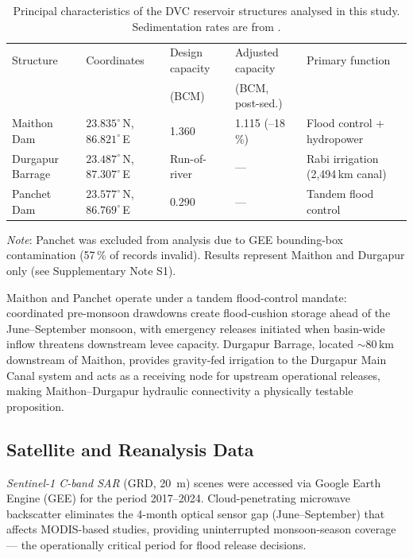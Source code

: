 \documentclass[preprint,12pt,authoryear]{elsarticle}
\begin{document}
\begin{table}[htbp]
  \centering
  \caption{Principal characteristics of the DVC reservoir structures analysed
           in this study. Sedimentation rates are from
           \citet{CWC2022}.}
  \label{tab:reservoirs}
  \begin{tabularx}{\linewidth}{lXXXX}
    \toprule
    Structure & Coordinates & Design capacity & Adjusted capacity & Primary function \\
              &             & (BCM)          & (BCM, post-sed.) &                  \\
    \midrule
    Maithon Dam    & $23.835^\circ$\,N, $86.821^\circ$\,E & 1.360 & 1.115 (--18\,\%) & Flood control + hydropower \\
    Durgapur Barrage & $23.487^\circ$\,N, $87.307^\circ$\,E & Run-of-river & --- & Rabi irrigation (2,494\,km canal) \\
    Panchet Dam    & $23.577^\circ$\,N, $86.769^\circ$\,E & 0.290 & --- & Tandem flood control \\
    \bottomrule
  \end{tabularx}
  \smallskip

  {\footnotesize\textit{Note}: Panchet was excluded from analysis due to
  GEE bounding-box contamination (57\,\% of records invalid). Results
  represent Maithon and Durgapur only (see Supplementary Note S1).}
\end{table}

Maithon and Panchet operate under a tandem flood-control mandate: coordinated
pre-monsoon drawdowns create flood-cushion storage ahead of the June--September
monsoon, with emergency releases initiated when basin-wide inflow threatens
downstream levee capacity. Durgapur Barrage, located $\sim 80$\,km downstream
of Maithon, provides gravity-fed irrigation to the Durgapur Main Canal system
and acts as a receiving node for upstream operational releases, making
Maithon--Durgapur hydraulic connectivity a physically testable proposition.

\subsection{Satellite and Reanalysis Data}
\label{sec:data_sources}

\textit{Sentinel-1 C-band SAR} (GRD, \SI{20}{\metre}) scenes were accessed
via Google Earth Engine (GEE) for the period 2017--2024. Cloud-penetrating
microwave backscatter eliminates the 4-month optical sensor gap
(June--September) that affects MODIS-based studies, providing uninterrupted
monsoon-season coverage --- the operationally critical period for flood release
decisions.
\end{document}
